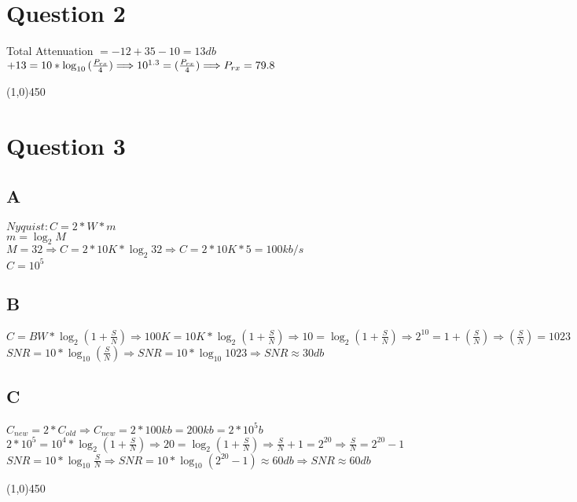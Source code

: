 \documentclass[a4paper,12pt]{article}
\begin{document}
\section {Question 2 }
\begin{doublespace}
Total Attenuation $= -12 + 35 - 10 = 13 db $ \\
$+13 = 10 * \log_{10} {(\frac {P_{rx}}{4})}  \Longrightarrow 10^{1.3} = (\frac {P_{rx}}{4}) \Longrightarrow P_{rx} = 79.8 $
\end{doublespace}
\line(1,0){450}
\section {Question 3 }

\subsection{A}
\begin{doublespace}
$Nyquist : C = 2 * W * m $ \\
$m = \log_2 {M}$\\
$M = 32 \Longrightarrow C = 2 * 10 K * \log_{2} {32}  \Longrightarrow C = 2 * 10K * 5 = 100 kb/s$\\
$C = 10^5$
\end{doublespace}



\subsection{B}
\begin{doublespace}
$C = BW * \log_2 {(1 + \frac{S}{N} )}  \Longrightarrow 100K = 10K * \log_2 {(1 + \frac{S}{N}) }  \Longrightarrow 10 = \log_2 {(1 + \frac{S}{N}) } \Longrightarrow 2^{10} = 1 + (\frac{S}{N}) \Longrightarrow (\frac{S}{N}) = 1023 $\\
$SNR = 10 * \log_{10} (\frac {S}{N}) \Longrightarrow SNR = 10 * \log_{10}{1023} \Longrightarrow SNR \approx 30 db$
\end{doublespace}


\subsection{C}
\begin{doublespace}
$C_{new} = 2 * C_{old} \Longrightarrow C_{new} = 2 * 100kb = 200kb = 2 * 10^5 b$\\
$2 * 10^5 = 10^4 * \log_2 {(1 + \frac{S}{N} ) } \Longrightarrow 20 = \log_2 {(1 + \frac{S}{N} )} \Longrightarrow \frac{S}{N} + 1 = 2 ^{20} \Longrightarrow \frac{S}{N} = 2^{20} - 1 $\\
$SNR = 10 * \log_{10}{\frac{S}{N}} \Longrightarrow SNR = 10 * \log_{10}{(2^{20} - 1) } \approx 60 db  \Longrightarrow SNR \approx 60 db$

\end{doublespace}
\line(1,0){450}
\end{document}
